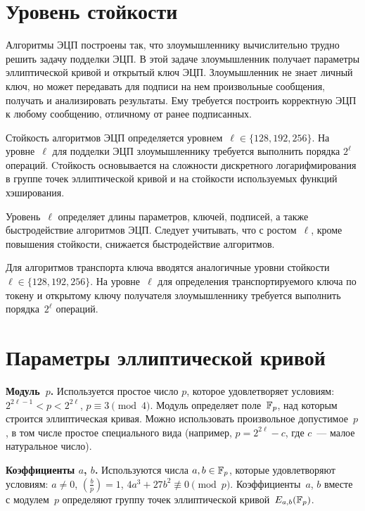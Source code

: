 \section{Уровень стойкости}\label{COMMON.Strength}

Алгоритмы ЭЦП построены так, что злоумышленнику 
вычислительно трудно решить задачу подделки ЭЦП.
%
В этой задаче злоумышленник получает параметры эллиптической кривой 
и открытый ключ ЭЦП. Злоумышленник не знает личный ключ, 
но может передавать для подписи на нем произвольные сообщения, 
получать и анализировать результаты.
%
Ему требуется построить корректную ЭЦП к любому сообщению,
отличному от ранее подписанных.

Стойкость алгоритмов ЭЦП определяется уровнем~$\ell\in\{128,192,256\}$.
%
На уровне~$\ell$ для подделки ЭЦП злоумышленнику требуется выполнить 
порядка $2^\ell$ операций. 
%
Cтойкость основывается на сложности дискретного логарифмирования 
в группе точек эллиптической кривой и на стойкости используемых 
функций хэширования.

Уровень~$\ell$ определяет длины параметров, 
ключей, подписей, а также быстродействие алгоритмов ЭЦП. 
%
Следует учитывать, что с ростом~$\ell$, кроме повышения стойкости,
снижается быстродействие алгоритмов.

Для алгоритмов транспорта ключа вводятся аналогичные уровни 
стойкости~$\ell\in\{128,192,256\}$.
На уровне~$\ell$ для определения транспортируемого ключа 
по токену и открытому ключу получателя 
злоумышленнику требуется выполнить порядка~$2^\ell$ операций. 

\section{Параметры эллиптической кривой}\label{COMMON.Params}

{\bf Модуль~$p$.} 
Используется простое число $p$, которое удовлетворяет условиям:
$2^{2\ell-1}<p<2^{2\ell}$, $p\equiv 3\pmod{4}$.
%
Модуль определяет поле~$\mathbb{F}_p$, 
над которым строится эллиптическая кривая.
%
Можно использовать произвольное допустимое~$p$, 
в том числе простое специального вида 
(например, $p=2^{2\ell}-c$, где $c$~--- малое натуральное число).

{\bf Коэффициенты $a$, $b$.} 
Используются числа $a,b\in\mathbb{F}_p$, которые удовлетворяют условиям:
$a\neq 0$,
$\left(\frac{b}{p}\right)=1$,
$4a^3+27b^2\not\equiv 0\pmod{p}$.
%
Коэффициенты~$a$, $b$ вместе с модулем~$p$ 
определяют группу точек эллиптической кривой~$E_{a,b}(\mathbb{F}_p)$.

